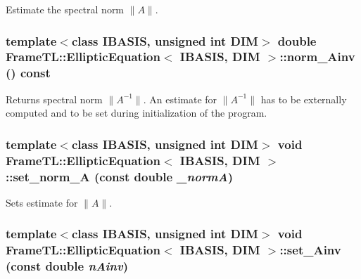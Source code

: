 Estimate the spectral norm $\|A\|$. \hypertarget{classFrameTL_1_1EllipticEquation_dac74894c3281ab4384e9333792726fc}{
\subsubsection[norm\_\-Ainv]{\setlength{\rightskip}{0pt plus 5cm}template$<$class IBASIS, unsigned int DIM$>$ double {\bf FrameTL::EllipticEquation}$<$ IBASIS, DIM $>$::norm\_\-Ainv () const}}
\label{classFrameTL_1_1EllipticEquation_dac74894c3281ab4384e9333792726fc}


Returns spectral norm $\|A^{-1}\|$. An estimate for $\|A^{-1}\|$ has to be externally computed and to be set during initialization of the program. \hypertarget{classFrameTL_1_1EllipticEquation_324bc7e2d2cc5a9e51fa6da305dae04b}{
\subsubsection[set\_\-norm\_\-A]{\setlength{\rightskip}{0pt plus 5cm}template$<$class IBASIS, unsigned int DIM$>$ void {\bf FrameTL::EllipticEquation}$<$ IBASIS, DIM $>$::set\_\-norm\_\-A (const double {\em \_\-normA})}}
\label{classFrameTL_1_1EllipticEquation_324bc7e2d2cc5a9e51fa6da305dae04b}


Sets estimate for $\|A\|$. \hypertarget{classFrameTL_1_1EllipticEquation_556d174fe601791cb7b33264c7e7c4ec}{
\subsubsection[set\_\-Ainv]{\setlength{\rightskip}{0pt plus 5cm}template$<$class IBASIS, unsigned int DIM$>$ void {\bf FrameTL::EllipticEquation}$<$ IBASIS, DIM $>$::set\_\-Ainv (const double {\em nAinv})}}
\label{classFrameTL_1_1EllipticEquation_556d174fe601791cb7b33264c7e7c4ec}


